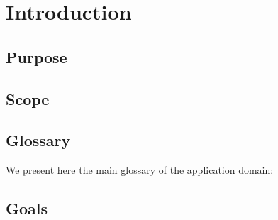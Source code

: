 \chapter{Introduction}

\section{Purpose}
\section{Scope}
\section{Glossary}
We present here the main glossary of the application domain:

\section{Goals}